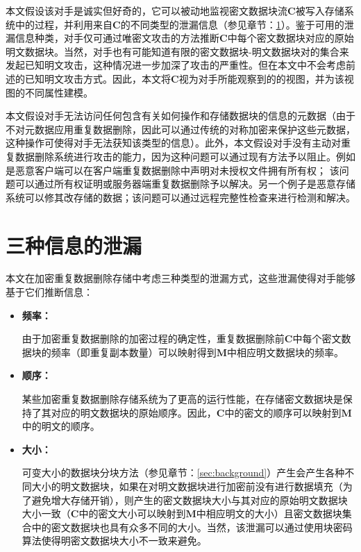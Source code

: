   
本文假设该对手是诚实但好奇的，它可以被动地监视密文数据块流$\mathbf{C}$被写入存储系统中的过程，并利用来自$\mathbf{C}$的不同类型的泄漏信息（参见章节：\ref{sec:ThreatModel-Leakage}）。鉴于可用的泄漏信息种类，对手仅可通过唯密文攻击的方法推断$\mathbf{C}$中每个密文数据块对应的原始明文数据块。当然，对手也有可能知道有限的密文数据块-明文数据块对的集合来发起已知明文攻击，这种情况进一步加深了攻击的严重性。但在本文中不会考虑前述的已知明文攻击方式。因此，本文将$\mathbf{C}$视为对手所能观察到的的视图，并为该视图的不同属性建模。

本文假设对手无法访问任何包含有关如何操作和存储数据块的信息的元数据（由于不对元数据应用重复数据删除，因此可以通过传统的对称加密来保护这些元数据，这种操作可使得对手无法获知该类型的信息）。此外，本文假设对手没有主动对重复数据删除系统进行攻击的能力，因为这种问题可以通过现有方法予以阻止。例如是恶意客户端可以在客户端重复数据删除中声明对未授权文件拥有所有权； 该问题可以通过所有权证明或服务器端重复数据删除予以解决。另一个例子是恶意存储系统可以修其改存储的数据；该问题可以通过远程完整性检查来进行检测和解决。

\section{三种信息的泄漏}
\label{sec:ThreatModel-Leakage}

本文在加密重复数据删除存储中考虑三种类型的泄漏方式，这些泄漏使得对手能够基于它们推断信息：

\begin{itemize}
    \item \textbf{频率：}  

    由于加密重复数据删除的加密过程的确定性，重复数据删除前$\mathbf{C}$中每个密文数据块的频率（即重复副本数量）可以映射得到$\mathbf{M}$中相应明文数据块的频率。

    \item \textbf{顺序：} 
 
    某些加密重复数据删除存储系统\cite{xia2011silo,lillibridge2009sparse,zhu2008avoiding}为了更高的运行性能，在存储密文数据块是保持了其对应的明文数据块的原始顺序。因此，$\mathbf{C}$中的密文的顺序可以映射到$\mathbf{M}$中的明文的顺序。

    \item \textbf{大小：} 

    可变大小的数据块分块方法（参见章节：\ref{sec:background}）产生会产生各种不同大小的明文数据块，如果在对明文数据块进行加密前没有进行数据填充（为了避免增大存储开销），则产生的密文数据块大小与其对应的原始明文数据块大小一致（$\mathbf{C}$中的密文大小可以映射到$\mathbf{M}$中相应明文的大小）且密文数据块集合中的密文数据块也具有众多不同的大小。当然，该泄漏可以通过使用块密码算法使得明密文数据块大小不一致来避免。
\end{itemize}


